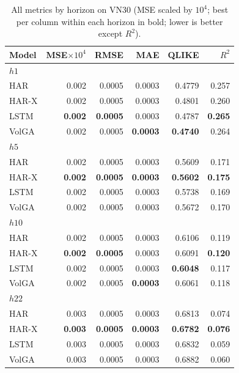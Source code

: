 \begin{table}[t]
\centering
\caption{All metrics by horizon on VN30 (MSE scaled by $10^{4}$; best per column within each horizon in bold; lower is better except $R^2$).}
\label{tab:full_vn30}
\begin{tabular}{lrrrrr}
\toprule
Model & MSE$\times10^{4}$ & RMSE & MAE & QLIKE & $R^2$ \\
\midrule
\multicolumn{6}{l}{\textit{$h1$}} \\
HAR & 0.002 & 0.0005 & 0.0003 & 0.4779 & 0.257 \\
HAR-X & 0.002 & 0.0005 & 0.0003 & 0.4801 & 0.260 \\
LSTM & \textbf{0.002} & \textbf{0.0005} & 0.0003 & 0.4787 & \textbf{0.265} \\
VolGA & 0.002 & 0.0005 & \textbf{0.0003} & \textbf{0.4740} & 0.264 \\
\midrule
\multicolumn{6}{l}{\textit{$h5$}} \\
HAR & 0.002 & 0.0005 & 0.0003 & 0.5609 & 0.171 \\
HAR-X & \textbf{0.002} & \textbf{0.0005} & \textbf{0.0003} & \textbf{0.5602} & \textbf{0.175} \\
LSTM & 0.002 & 0.0005 & 0.0003 & 0.5738 & 0.169 \\
VolGA & 0.002 & 0.0005 & 0.0003 & 0.5672 & 0.170 \\
\midrule
\multicolumn{6}{l}{\textit{$h10$}} \\
HAR & 0.002 & 0.0005 & 0.0003 & 0.6106 & 0.119 \\
HAR-X & \textbf{0.002} & \textbf{0.0005} & 0.0003 & 0.6091 & \textbf{0.120} \\
LSTM & 0.002 & 0.0005 & 0.0003 & \textbf{0.6048} & 0.117 \\
VolGA & 0.002 & 0.0005 & \textbf{0.0003} & 0.6061 & 0.118 \\
\midrule
\multicolumn{6}{l}{\textit{$h22$}} \\
HAR & 0.003 & 0.0005 & 0.0003 & 0.6813 & 0.074 \\
HAR-X & \textbf{0.003} & \textbf{0.0005} & \textbf{0.0003} & \textbf{0.6782} & \textbf{0.076} \\
LSTM & 0.003 & 0.0005 & 0.0003 & 0.6832 & 0.059 \\
VolGA & 0.003 & 0.0005 & 0.0003 & 0.6882 & 0.060 \\
\bottomrule
\end{tabular}
\end{table}

